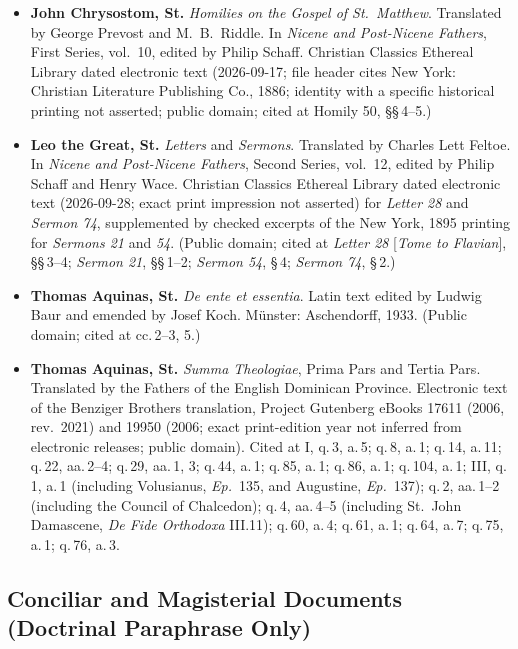 \begin{itemize}
\item \textbf{John Chrysostom, St.} \textit{Homilies on the Gospel of St.\ Matthew}. Translated by George Prevost and M.\ B.\ Riddle. In \textit{Nicene and Post-Nicene Fathers}, First Series, vol.\ 10, edited by Philip Schaff. Christian Classics Ethereal Library dated electronic text (2026-09-17; file header cites New York: Christian Literature Publishing Co., 1886; identity with a specific historical printing not asserted; public domain; cited at Homily 50, \S\S\,4--5.)
\item \textbf{Leo the Great, St.} \textit{Letters} and \textit{Sermons}. Translated by Charles Lett Feltoe. In \textit{Nicene and Post-Nicene Fathers}, Second Series, vol.\ 12, edited by Philip Schaff and Henry Wace. Christian Classics Ethereal Library dated electronic text (2026-09-28; exact print impression not asserted) for \textit{Letter 28} and \textit{Sermon 74}, supplemented by checked excerpts of the New York, 1895 printing for \textit{Sermons 21} and \textit{54}. (Public domain; cited at \textit{Letter 28} [\textit{Tome to Flavian}], \S\S\,3--4; \textit{Sermon 21}, \S\S\,1--2; \textit{Sermon 54}, \S\,4; \textit{Sermon 74}, \S\,2.)
\item \textbf{Thomas Aquinas, St.} \textit{De ente et essentia}. Latin text edited by Ludwig Baur and emended by Josef Koch. M\"unster: Aschendorff, 1933. (Public domain; cited at cc.\,2--3, 5.)
\item \textbf{Thomas Aquinas, St.} \textit{Summa Theologiae}, Prima Pars and Tertia Pars. Translated by the Fathers of the English Dominican Province. Electronic text of the Benziger Brothers translation, Project Gutenberg eBooks 17611 (2006, rev.\ 2021) and 19950 (2006; exact print-edition year not inferred from electronic releases; public domain). Cited at I, q.\,3, a.\,5; q.\,8, a.\,1; q.\,14, a.\,11; q.\,22, aa.\,2--4; q.\,29, aa.\,1, 3; q.\,44, a.\,1; q.\,85, a.\,1; q.\,86, a.\,1; q.\,104, a.\,1; III, q.\,1, a.\,1 (including Volusianus, \textit{Ep.}\ 135, and Augustine, \textit{Ep.}\ 137); q.\,2, aa.\,1--2 (including the Council of Chalcedon); q.\,4, aa.\,4--5 (including St.\ John Damascene, \textit{De Fide Orthodoxa} III.11); q.\,60, a.\,4; q.\,61, a.\,1; q.\,64, a.\,7; q.\,75, a.\,1; q.\,76, a.\,3.
\end{itemize}

\subsection*{Conciliar and Magisterial Documents (Doctrinal Paraphrase Only)}

